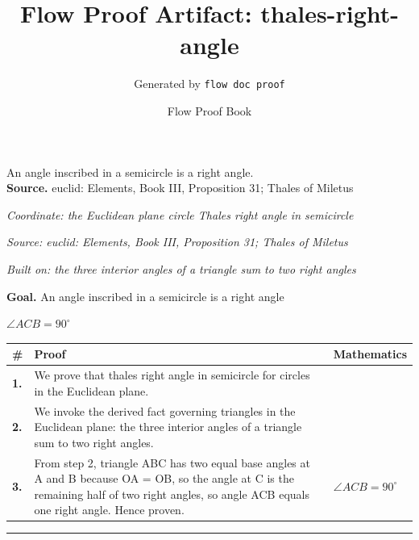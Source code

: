 \documentclass[11pt]{article}
\title{Flow Proof Artifact: thales-right-angle}
\author{Generated by \texttt{flow doc proof}}
\date{Flow Proof Book}
\theoremstyle{definition}
\begin{document}
\maketitle
An angle inscribed in a semicircle is a right angle.\\[0.5em]
\textbf{Source.} euclid: Elements, Book III, Proposition 31; Thales of Miletus\\[0.5em]
\bigskip
{}\par
\smallskip\noindent\textit{Coordinate: the Euclidean plane \cdot circle \cdot Thales right angle in semicircle}\par
\smallskip\noindent\textit{Source: euclid: Elements, Book III, Proposition 31; Thales of Miletus}\par
\smallskip\noindent\textit{Built on: the three interior angles of a triangle sum to two right angles}\par
\medskip
\noindent\textbf{Goal.} An angle inscribed in a semicircle is a right angle\par
\noindent$\displaystyle \angle ACB = 90^\circ$\par
\medskip
\noindent
\begin{tabular}{@{} >{\raggedright\arraybackslash}p{} >{\raggedright\arraybackslash}p{} >{\raggedleft\arraybackslash}p{} @{}}
\textbf{\#} & \textbf{Proof} & \textbf{Mathematics} \\
\midrule
\textbf{1.} & We prove that thales right angle in semicircle for circles in the Euclidean plane. & \\[0.45em]
\textbf{2.} & We invoke the derived fact governing triangles in the Euclidean plane: the three interior angles of a triangle sum to two right angles. & \\[0.45em]
\textbf{3.} & From step 2, triangle ABC has two equal base angles at A and B because OA = OB, so the angle at C is the remaining half of two right angles, so angle ACB equals one right angle. Hence proven. & $\displaystyle \angle ACB = 90^\circ$ \\[0.45em]
\bottomrule
\end{tabular}
\label{thm:Geometry-circle-thales_right_angle_in_semicircle}
\par\medskip\hrule
\end{document}
